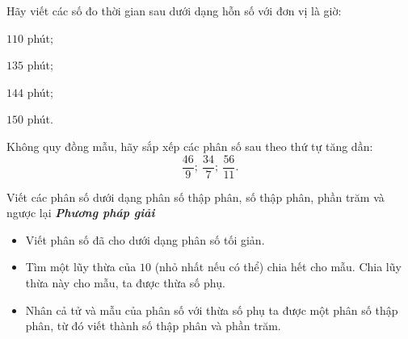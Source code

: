 \begin{vd} %
Hãy viết các số đo thời gian sau dưới dạng hỗn số với đơn vị là giờ:
\begin{listEX}[4]
\item $110$ phút;
\item $135$ phút;
\item $144$ phút;
\item $150$ phút.
\end{listEX} 
\end{vd}
\begin{vd} %
Không quy đồng mẫu, hãy sắp xếp các phân số sau theo thứ tự tăng dần:\\
$$\dfrac{46}{9};\ \dfrac{34}{7}; \ \dfrac{56}{11}.$$
\end{vd}
\setcounter{vd}{0}
\begin{dang}{Viết các phân số dưới dạng phân số thập phân, số thập phân, phần trăm và ngược lại }
\textbf{\textit{Phương pháp giải}}
\begin{itemize}
\item Viết phân số đã cho dưới dạng phân số tối giản.
\item Tìm một lũy thừa của $10$ (nhỏ nhất nếu có thể) chia hết cho mẫu. Chia lũy thừa này cho mẫu, ta được thừa số phụ.
\item Nhân cả tử và mẫu của phân số với thừa số phụ ta được một phân số thập phân, từ đó viết thành số thập phân và phần trăm.
\end{itemize}
\end{dang}

